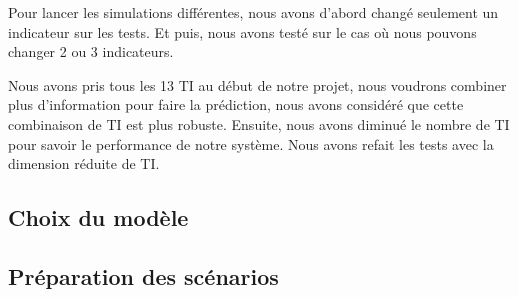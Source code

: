 Pour lancer les simulations différentes, nous avons d'abord changé seulement un indicateur sur les tests. Et puis, nous avons testé sur le cas où nous pouvons changer 2 ou 3 indicateurs. 

Nous avons pris tous les 13 TI au début de notre projet, nous voudrons combiner plus d’information pour faire la prédiction, nous avons considéré que cette combinaison de TI est plus robuste. Ensuite, nous avons diminué le nombre de TI pour savoir le performance de notre système. Nous avons refait les tests avec la dimension réduite de TI.

   	
\subsection{Choix du modèle}

\subsection{Préparation des scénarios}